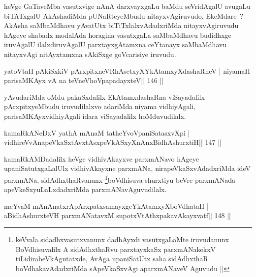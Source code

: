 \begin{artha}
heVge GaTaveMba vasutxvige nAnA darxvayxgaLu baMdu seVridAgalU avugaLu biTATxgalU AkAshadiMda pUNaRteyeMbudu nitayxvAgiruvudo, EkeMdare~? AkAsha saMbaMdhavu yAvatUtx biTiTxlalxvAdadxriMda nitayxvAgiruvudu hAgeye shabadx modalAda horagina vasutxgaLa saMbaMdhavu budidhxge iruvAgalU ilalxdiruvAgalU parxtayxgAtamxna ceYtanayx saMbaMdhavu nitayxvAgi nitAyxtamxna sAkiSxge goVcarisiye iruvudu.
\end{artha}

\begin{shl}
yatoV\s taH pAkiSxkiV pArxpitxneVRhAsetxyXYkAtamxyXdashaRneV |
niyamaH parisaMKAyx vA na teVneVhoVpapadayxteV\hfill || 146 ||
\end{shl}

\begin{artha}
yAvudariMda oMdu pakaSxdalilx EkAtamxdashaRna viSayadalilx pArxpitxyeMbudu iruvudilalxvo adariMda niyama vidhiyAgali, parisaMKAyxvidhiyAgali idara viSayadalilx hoMduvudilalx.
\end{artha}


\begin{shl}
kamaRkANeDxV yathA mAnaM tatheYvoVpaniSatasxvXpi |
vidhireVvAnapeVkaSxtAvxtAsxpeVkASxyXnAnx\footnotemark[3]BidhAshurxtiH\hfill || 147 ||
\end{shl}

\begin{artha}
kamaRkAMDadalilx heVge vidhivAkayxve parxmANavo hAgeye upaniSatutxgaLalUlx vidhivAkayxne parxmANa, nirapeVkaSxvAdadxriMda ideV parxmANa, sidAdhxthaRvanunx \footnote[4]{keVvala sidadhxvasutxvanunx dadhAyxdi vasutxgaLaMte iruvudanunx BoVdhisuvalilx A sidAdhxthaRvu parxtayxkaSx parxmANakekxV tiLidirabeVkAgutatxde, AvAga upaniSatUtx saha sidAdhxthaR boVdhakavAdadxriMda sApeVkaSxvAgi aparxmANaveV Aguvudu ||}boVdhisuva shurxtiyu beVre parxmANada apeVkeSxyuLaLxdadxriMda parxmANavAguvudilalx.
\end{artha}


\begin{shl}
meYvaM mAnAnatxrApArxpatxsamayxgeYkAtamxyXboVdhataH |
aBidhAshurxteVH parxmANatavxM supotxVtAthxpakavAkayxvatf\hfill || 148 ||
\end{shl}

